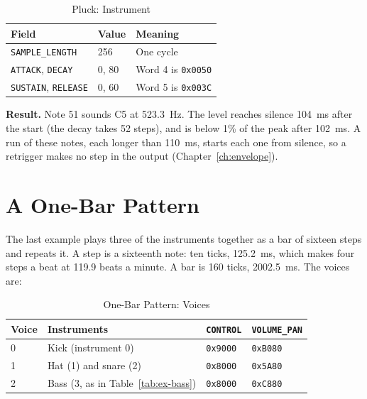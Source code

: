 \begin{table}[H]
	\centering
	\begin{tabular}{llp{6cm}}
		\toprule
		\textbf{Field}                     & \textbf{Value} & \textbf{Meaning}          \\
		\midrule
		\texttt{SAMPLE\_LENGTH}            & 256            & One cycle                 \\
		\texttt{ATTACK}, \texttt{DECAY}    & 0, 80          & Word 4 is \texttt{0x0050} \\
		\texttt{SUSTAIN}, \texttt{RELEASE} & 0, 60          & Word 5 is \texttt{0x003C} \\
		\bottomrule
	\end{tabular}
	\caption{Pluck: Instrument}
	\label{tab:ex-pluck}
\end{table}

\textbf{Result.} Note 51 sounds C5 at 523.3~Hz. The level reaches silence 104~ms after the start (the decay takes 52
steps), and is below 1\% of the peak after 102~ms. A run of these notes, each longer than 110~ms, starts
each one from silence, so a retrigger makes no step in the output (Chapter~\ref{ch:envelope}).

\section{A One-Bar Pattern}

The last example plays three of the instruments together as a bar of sixteen steps and repeats it. A step is a
sixteenth note: ten ticks, 125.2~ms, which makes four steps a beat at 119.9 beats a minute. A bar is 160 ticks,
2002.5~ms. The voices are:

\begin{table}[H]
	\centering
	\begin{tabular}{llll}
		\toprule
		\textbf{Voice} & \textbf{Instruments}                    & \textbf{\texttt{CONTROL}} & \textbf{\texttt{VOLUME\_PAN}} \\
		\midrule
		0              & Kick (instrument 0)                     & \texttt{0x9000}           & \texttt{0xB080}               \\
		1              & Hat (1) and snare (2)                   & \texttt{0x8000}           & \texttt{0x5A80}               \\
		2              & Bass (3, as in Table~\ref{tab:ex-bass}) & \texttt{0x8000}           & \texttt{0xC880}               \\
		\bottomrule
	\end{tabular}
	\caption{One-Bar Pattern: Voices}
	\label{tab:ex-pattern-voices}
\end{table}

